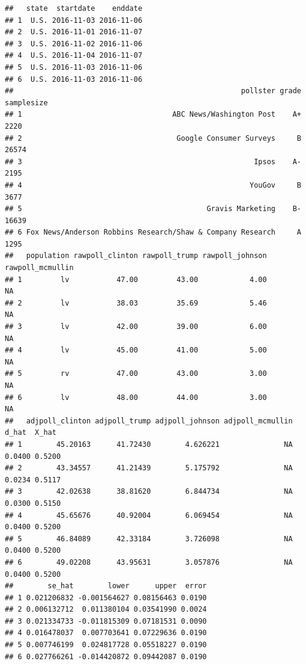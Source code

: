 \documentclass[
]{article}
\begin{document}
\begin{verbatim}
##   state  startdate    enddate
## 1  U.S. 2016-11-03 2016-11-06
## 2  U.S. 2016-11-01 2016-11-07
## 3  U.S. 2016-11-02 2016-11-06
## 4  U.S. 2016-11-04 2016-11-07
## 5  U.S. 2016-11-03 2016-11-06
## 6  U.S. 2016-11-03 2016-11-06
##                                                     pollster grade samplesize
## 1                                   ABC News/Washington Post    A+       2220
## 2                                    Google Consumer Surveys     B      26574
## 3                                                      Ipsos    A-       2195
## 4                                                     YouGov     B       3677
## 5                                           Gravis Marketing    B-      16639
## 6 Fox News/Anderson Robbins Research/Shaw & Company Research     A       1295
##   population rawpoll_clinton rawpoll_trump rawpoll_johnson rawpoll_mcmullin
## 1         lv           47.00         43.00            4.00               NA
## 2         lv           38.03         35.69            5.46               NA
## 3         lv           42.00         39.00            6.00               NA
## 4         lv           45.00         41.00            5.00               NA
## 5         rv           47.00         43.00            3.00               NA
## 6         lv           48.00         44.00            3.00               NA
##   adjpoll_clinton adjpoll_trump adjpoll_johnson adjpoll_mcmullin  d_hat  X_hat
## 1        45.20163      41.72430        4.626221               NA 0.0400 0.5200
## 2        43.34557      41.21439        5.175792               NA 0.0234 0.5117
## 3        42.02638      38.81620        6.844734               NA 0.0300 0.5150
## 4        45.65676      40.92004        6.069454               NA 0.0400 0.5200
## 5        46.84089      42.33184        3.726098               NA 0.0400 0.5200
## 6        49.02208      43.95631        3.057876               NA 0.0400 0.5200
##        se_hat        lower      upper  error
## 1 0.021206832 -0.001564627 0.08156463 0.0190
## 2 0.006132712  0.011380104 0.03541990 0.0024
## 3 0.021334733 -0.011815309 0.07181531 0.0090
## 4 0.016478037  0.007703641 0.07229636 0.0190
## 5 0.007746199  0.024817728 0.05518227 0.0190
## 6 0.027766261 -0.014420872 0.09442087 0.0190
\end{verbatim}
\end{document}
